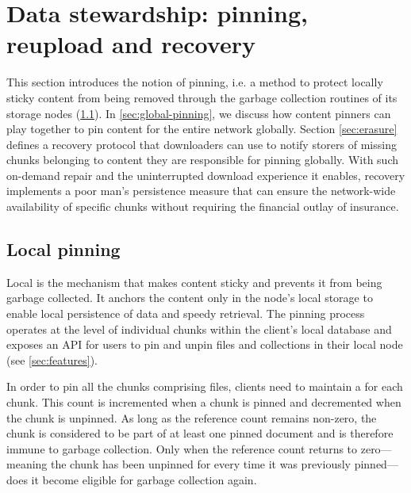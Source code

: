 


\section{Data stewardship: pinning, reupload and recovery \statusyellow}\label{sec:reupload}

This section introduces the notion of pinning, i.e. a method to protect locally sticky content from being removed through the garbage collection routines of its storage nodes (\ref{sec:pinning}). In \ref{sec:global-pinning}, we discuss how content pinners can play together to pin content for the entire network globally. Section \ref{sec:erasure} defines a recovery protocol that downloaders can use to notify storers of missing chunks belonging to content they are responsible for pinning globally. With such on-demand repair and the uninterrupted download experience it enables, recovery implements a poor man's persistence measure that can ensure the network-wide availability of specific chunks without requiring the financial outlay of insurance.

\subsection{Local pinning \statusgreen}\label{sec:pinning}

Local  is the mechanism that makes content sticky and prevents it from being garbage collected. It anchors the content only in the node's local storage to enable local persistence of data and speedy retrieval. The pinning process operates at the level of individual chunks within the client's local database and exposes an API for users to pin and unpin files and collections in their local node (see \ref{sec:features}).

In order to pin all the chunks comprising files, clients need to maintain a  for each chunk. This count is incremented when a chunk is pinned and decremented when the chunk is unpinned. As long as the reference count remains non-zero, the chunk is considered to be part of at least one pinned document and is therefore immune to garbage collection. Only when the reference count returns to zero---meaning the chunk has been unpinned for every time it was previously pinned---does it become eligible for garbage collection again.

